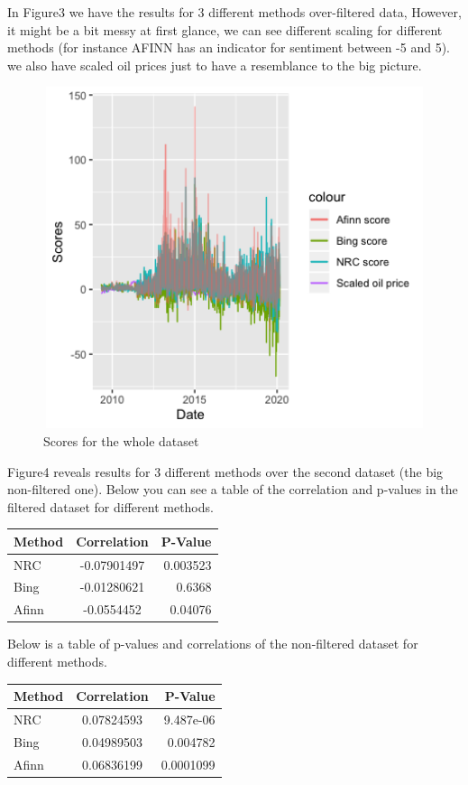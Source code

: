 \documentclass[]{article}
\begin{document}
In Figure3 we have the results for 3 different methods over-filtered
data, However, it might be a bit messy at first glance, we can see
different scaling for different methods (for instance AFINN has an
indicator for sentiment between -5 and 5). we also have scaled oil
prices just to have a resemblance to the big picture.

\begin{figure}
\includegraphics[width=15cm,
  height=10cm,
  keepaspectratio]{fulldata}
\centering
\caption{Scores for the whole dataset}\label{Figure4}
\end{figure}

Figure4 reveals results for 3 different methods over the second dataset
(the big non-filtered one). Below you can see a table of the correlation
and p-values in the filtered dataset for different methods.

\begin{longtable}[]{@{}lcr@{}}
\toprule
Method & Correlation & P-Value\tabularnewline
\midrule
\endhead
NRC & -0.07901497 & 0.003523\tabularnewline
Bing & -0.01280621 & 0.6368\tabularnewline
Afinn & -0.0554452 & 0.04076\tabularnewline
\bottomrule
\end{longtable}

Below is a table of p-values and correlations of the non-filtered
dataset for different methods.

\begin{longtable}[]{@{}lcr@{}}
\toprule
Method & Correlation & P-Value\tabularnewline
\midrule
\endhead
NRC & 0.07824593 & 9.487e-06\tabularnewline
Bing & 0.04989503 & 0.004782\tabularnewline
Afinn & 0.06836199 & 0.0001099\tabularnewline
\bottomrule
\end{longtable}
\end{document}

